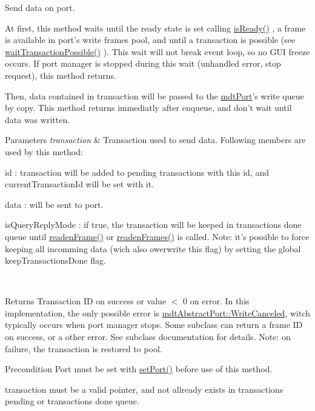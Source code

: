 Send data on port. 

At first, this method waits until the ready state is set calling \hyperlink{classmdt_port_manager_a6dc2798324521d177fb8f79d4f6c5f0f}{is\-Ready()} , a frame is available in port's write frames pool, and until a transaction is possible (see \hyperlink{classmdt_port_manager_ac04a12f8aa20ba04695083afce45a6cc}{wait\-Transaction\-Possible()} ). This wait will not break event loop, so no G\-U\-I freeze occurs. If port manager is stopped during this wait (unhandled error, stop request), this method returns.

Then, data contained in transaction will be passed to the \hyperlink{classmdt_port}{mdt\-Port}'s write queue by copy. This method returns immediatly after enqueue, and don't wait until data was written.


\begin{DoxyParams}{Parameters}
{\em transaction} & Transaction used to send data. Following members are used by this method\-:
\begin{DoxyItemize}
\item id \-: transaction will be added to pending transactions with this id, and current\-Transaction\-Id will be set with it.
\item data \-: will be sent to port.
\item is\-Query\-Reply\-Mode \-: if true, the transaction will be keeped in transactions done queue until \hyperlink{classmdt_port_manager_a830ae182d06dd6a52c43a7f45b9240ac}{readen\-Frame()} or \hyperlink{classmdt_port_manager_addd5dcae9644cea42a9871205af41796}{readen\-Frames()} is called. Note\-: it's possible to force keeping all incomming data (wich also owerwrite this flag) by setting the global keep\-Transactions\-Done flag.
\end{DoxyItemize}\\
\hline
\end{DoxyParams}
\begin{DoxyReturn}{Returns}
Transaction I\-D on success or value $<$ 0 on error. In this implementation, the only possible error is \hyperlink{classmdt_abstract_port_ad4121bb930c95887e77f8bafa065a85eae50ff4a9393507ad39005ddc7d5be42f}{mdt\-Abstract\-Port\-::\-Write\-Canceled}, witch typically occurs when port manager stops. Some subclass can return a frame I\-D on success, or a other error. See subclass documentation for details. Note\-: on failure, the transaction is restored to pool. 
\end{DoxyReturn}
\begin{DoxyPrecond}{Precondition}
Port must be set with \hyperlink{classmdt_port_manager_afcd156b2d0c9d340999935efb6cd8cb6}{set\-Port()} before use of this method. 

transaction must be a valid pointer, and not allready exists in transactions pending or transactions done queue.
\end{DoxyPrecond}
